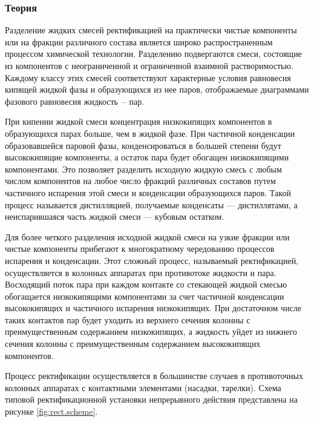 

\subsubsection{Теория}
Разделение жидких смесей ректификацией на практически чистые компоненты или на фракции различного состава является широко распространенным процессом химической технологии. Разделению подвергаются смеси, состоящие из компонентов с неограниченной и ограниченной взаимной растворимостью. Каждому классу этих смесей соответствуют характерные условия равновесия кипящей жидкой фазы и образующихся из нее паров, отображаемые диаграммами фазового равновесия жидкость~-- пар.

При кипении жидкой смеси концентрация низкокипящих компонентов в образующихся парах больше, чем в жидкой фазе. При частичной конденсации образовавшейся паровой фазы, конденсироваться в большей степени будут высококипящие компоненты, а остаток пара будет обогащен низкокипящими компонентами. Это позволяет разделить исходную жидкую смесь с любым числом компонентов на любое число фракций различных составов путем частичного испарения этой смеси и конденсации образующихся паров. Такой процесс называется дистилляцией, получаемые конденсаты --- дистиллятами, а неиспарившаяся часть жидкой смеси --- кубовым остатком. 

Для более четкого разделения исходной жидкой смеси на узкие фракции или чистые компоненты прибегают к многократному чередованию процессов испарения и конденсации. Этот сложный процесс, называемый ректификацией, осуществляется в колонных аппаратах при противотоке жидкости и пара. Восходящий поток пара при каждом контакте со стекающей жидкой смесью обогащается низкокипящими компонентами за счет частичной конденсации высококипящих и частичного испарения низкокипящих. При достаточном числе таких контактов пар будет уходить из верхнего сечения колонны с преимущественным содержанием низкокипящих, а жидкость уйдет из нижнего сечения колонны с преимущественным содержанием высококипящих компонентов.

Процесс ректификации осуществляется в большинстве случаев в противоточных колонных аппаратах с контактными элементами (насадки, тарелки). Схема типовой ректификационной установки непрерывного действия представлена на рисунке \ref{fig:rect.scheme}.

